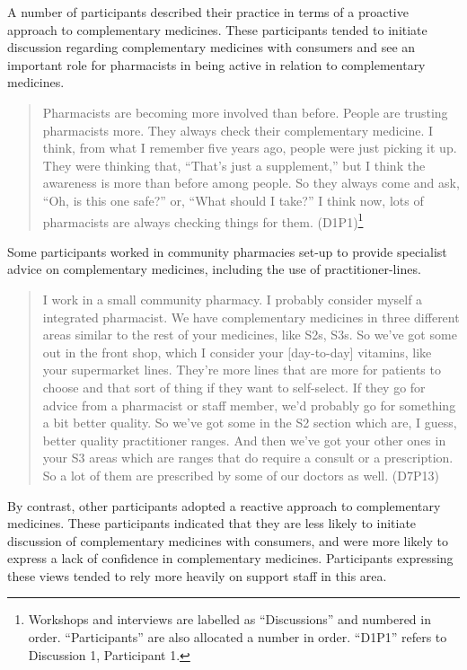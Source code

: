 \documentclass[11pt,a4paper]{article}
\begin{document}
A number of participants described their practice in terms of a
proactive approach to complementary medicines. These participants tended
to initiate discussion regarding complementary medicines with consumers
and see an important role for pharmacists in being active in relation to
complementary medicines.

\begin{quote}
Pharmacists are becoming more involved than before. People are trusting
pharmacists more. They always check their complementary medicine. I
think, from what I remember five years ago, people were just picking it
up. They were thinking that, ``That's just a supplement,'' but I think
the awareness is more than before among people. So they always come and
ask, ``Oh, is this one safe?'' or, ``What should I take?'' I think now,
lots of pharmacists are always checking things for them.
(D1P1)\footnote{Workshops and interviews are labelled as ``Discussions''
  and numbered in order. ``Participants'' are also allocated a number in
  order. ``D1P1'' refers to Discussion 1, Participant 1.}
\end{quote}

Some participants worked in community pharmacies set-up to provide
specialist advice on complementary medicines, including the use of
practitioner-lines.

\begin{quote}
I work in a small community pharmacy. I probably consider myself a
integrated pharmacist. We have complementary medicines in three
different areas similar to the rest of your medicines, like S2s, S3s. So
we've got some out in the front shop, which I consider your
{[}day-to-day{]} vitamins, like your supermarket lines. They're more
lines that are more for patients to choose and that sort of thing if
they want to self-select. If they go for advice from a pharmacist or
staff member, we'd probably go for something a bit better quality. So
we've got some in the S2 section which are, I guess, better quality
practitioner ranges. And then we've got your other ones in your S3 areas
which are ranges that do require a consult or a prescription. So a lot
of them are prescribed by some of our doctors as well. (D7P13)
\end{quote}

By contrast, other participants adopted a reactive approach to
complementary medicines. These participants indicated that they are less
likely to initiate discussion of complementary medicines with consumers,
and were more likely to express a lack of confidence in complementary
medicines. Participants expressing these views tended to rely more
heavily on support staff in this area.
\end{document}
